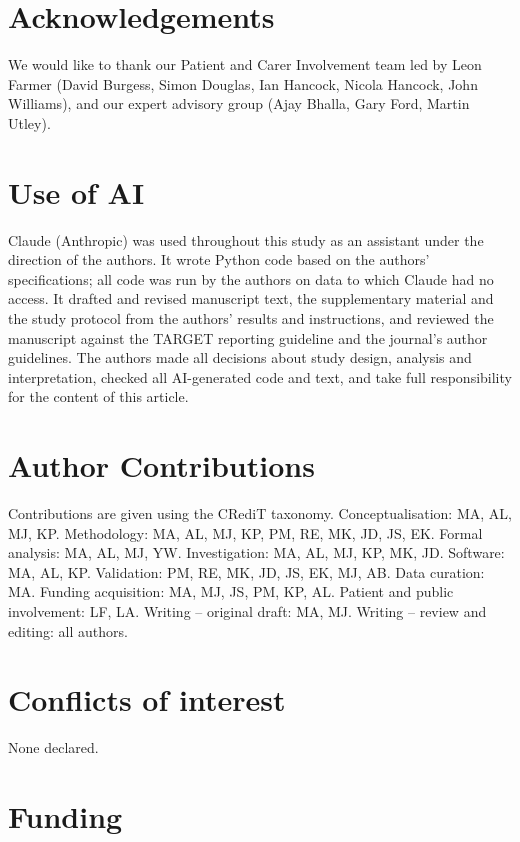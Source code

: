 \section*{Acknowledgements}

We would like to thank our Patient and Carer Involvement team led by Leon Farmer (David Burgess, Simon Douglas, Ian Hancock, Nicola Hancock, John Williams), and our expert advisory group (Ajay Bhalla, Gary Ford, Martin Utley).

\section*{Use of AI}

Claude (Anthropic) was used throughout this study as an assistant under the direction of the authors. It wrote Python code based on the authors' specifications; all code was run by the authors on data to which Claude had no access. It drafted and revised manuscript text, the supplementary material and the study protocol from the authors' results and instructions, and reviewed the manuscript against the TARGET reporting guideline and the journal's author guidelines. The authors made all decisions about study design, analysis and interpretation, checked all AI-generated code and text, and take full responsibility for the content of this article.

\section*{Author Contributions}

Contributions are given using the CRediT taxonomy. Conceptualisation: MA, AL, MJ, KP. Methodology: MA, AL, MJ, KP, PM, RE, MK, JD, JS, EK. Formal analysis: MA, AL, MJ, YW. Investigation: MA, AL, MJ, KP, MK, JD. Software: MA, AL, KP. Validation: PM, RE, MK, JD, JS, EK, MJ, AB. Data curation: MA. Funding acquisition: MA, MJ, JS, PM, KP, AL.   Patient and public involvement: LF, LA. Writing -- original draft: MA, MJ. Writing -- review and editing: all authors.

\section*{Conflicts of interest}

None declared. 

\section*{Funding}

